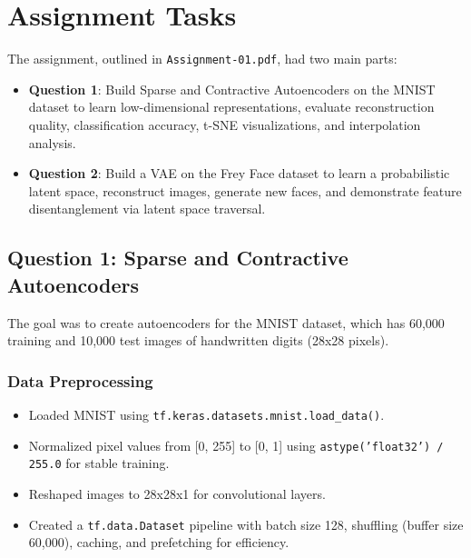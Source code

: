 \documentclass[12pt]{article}
\begin{document}
	\section{Assignment Tasks}
	The assignment, outlined in \texttt{Assignment-01.pdf}, had two main parts:
	\begin{itemize}
		\item \textbf{Question 1}: Build Sparse and Contractive Autoencoders on the MNIST dataset to learn low-dimensional representations, evaluate reconstruction quality, classification accuracy, t-SNE visualizations, and interpolation analysis.
		\item \textbf{Question 2}: Build a VAE on the Frey Face dataset to learn a probabilistic latent space, reconstruct images, generate new faces, and demonstrate feature disentanglement via latent space traversal.
	\end{itemize}
	
	\subsection{Question 1: Sparse and Contractive Autoencoders}
	The goal was to create autoencoders for the MNIST dataset, which has 60,000 training and 10,000 test images of handwritten digits (28x28 pixels).
	
	\subsubsection{Data Preprocessing}
	\begin{itemize}
		\item Loaded MNIST using \texttt{tf.keras.datasets.mnist.load\_data()}.
		\item Normalized pixel values from [0, 255] to [0, 1] using \texttt{astype('float32') / 255.0} for stable training.
		\item Reshaped images to 28x28x1 for convolutional layers.
		\item Created a \texttt{tf.data.Dataset} pipeline with batch size 128, shuffling (buffer size 60,000), caching, and prefetching for efficiency.
	\end{itemize}
	
\end{document}
